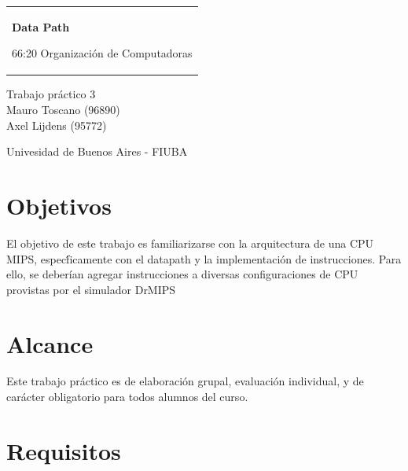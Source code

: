 \documentclass[11pt,a4paper, spanish]{article}
\begin{document}

\begin{titlepage}
  \noindent%
  \begin{tabular}{@{}p{\textwidth}@{}}
    \vspace{0.2cm}
    \begin{center}
    \Huge{\textbf{
      Data Path
    }}
    \end{center}
    \begin{center}
      \Large{
         66:20 Organizaci\'on de Computadoras
      }
    \end{center}
    \vspace{0.2cm}\\
  \end{tabular}
  \vspace{4 cm}
  \begin{center}
    {\large
      Trabajo práctico 3
    }\\
    \vspace{0.6cm}
    {\Large
    Mauro Toscano (96890)\\
    Axel Lijdens (95772)
    }
  \end{center}
  \vfill
  \begin{center}
  Univesidad de Buenos Aires - FIUBA
  \end{center}
\end{titlepage}


\tableofcontents
\pagebreak

\section{Objetivos}

El objetivo de este trabajo es familiarizarse con la arquitectura de una CPU MIPS, espec\'ficamente con el datapath y la implementación de instrucciones. Para ello, se deberían agregar instrucciones a diversas configuraciones de CPU provistas por el simulador DrMIPS

\section{Alcance}

Este trabajo práctico es de elaboración grupal, evaluación individual, y de carácter obligatorio para todos alumnos del curso.

\section{Requisitos}
\end{document}
